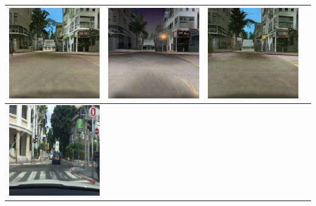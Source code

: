 \documentclass{VUMIFPSkursinis}
\begin{document}
\begin{table}[H]
{\begin{tabular}{|c|c|c|c|}
                \includegraphics[scale=0.35]{img/pvz/4_cycle_v2} & \includegraphics[scale=0.35]{img/pvz/4_cut_v2} & \includegraphics[scale=0.35]{img/pvz/4_mspc_v2}
                \\
                \hline
                \includegraphics[scale=0.35]{img/pvz/5_real} & 

\end{tabular}}
\end{table}
\end{document}
